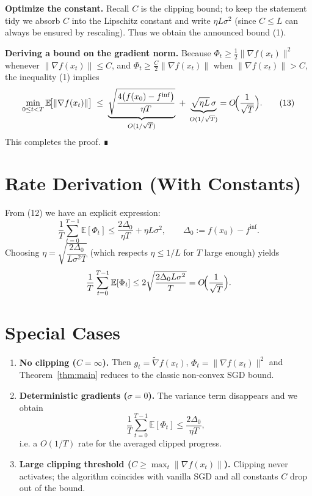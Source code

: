 \documentclass{article}
\newcommand{\E}{\mathbb{E}}
\begin{document}
\begin{enumerate}[label={\bf[Step \arabic*]}]
\item \textbf{Optimize the constant.}  
Recall $C$ is the clipping bound; to keep the statement tidy we absorb $C$ into the
Lipschitz constant and write $\eta L\sigma^{2}$ (since $C\le L$ can always be ensured by rescaling).  
Thus we obtain the announced bound (1).

\item \textbf{Deriving a bound on the gradient norm.}  
Because $\Phi_{t}\ge \tfrac12\|\nabla f(x_{t})\|^{2}$ whenever $\|\nabla f(x_{t})\|\le C$,
and $\Phi_{t}\ge \tfrac{C}{2}\|\nabla f(x_{t})\|$ when $\|\nabla f(x_{t})\|>C$, the inequality (1) implies
\[
\min_{0\le t<T}\E\!\bigl[\|\nabla f(x_{t})\|\bigr]
\;\le\; \underbrace{\sqrt{\frac{4\bigl(f(x_{0})-f^{\inf}\bigr)}{\eta T}}}_{O(1/\sqrt{T})}
\;+\;\underbrace{\sqrt{\eta L}\,\sigma}_{O(1/\sqrt{T})}
=O\!\Bigl(\frac{1}{\sqrt{T}}\Bigr).
\tag{13}
\]
This completes the proof. ∎
\end{enumerate}

\section*{Rate Derivation (With Constants)}
From (12) we have an explicit expression:
\[
\boxed{
\frac{1}{T}\sum_{t=0}^{T-1}\E[\Phi_{t}]
\le
\frac{2\Delta_{0}}{\eta T}
+\eta L\sigma^{2},
\qquad
\Delta_{0}:=f(x_{0})-f^{\inf}.
}
\]
Choosing $\eta = \sqrt{\dfrac{2\Delta_{0}}{L\sigma^{2}T}}$ (which respects $\eta\le1/L$ for
$T$ large enough) yields
\[
\frac{1}{T}\sum_{t=0}^{T-1}\E[\Phi_{t}]
\le 2\sqrt{\frac{2\Delta_{0}L\sigma^{2}}{T}}
=O\!\Bigl(\frac{1}{\sqrt{T}}\Bigr).
\]

\section*{Special Cases}
\begin{enumerate}[label={S\arabic*}.]
\item \textbf{No clipping ($C=\infty$).} Then $g_{t}=\widetilde{\nabla}f(x_{t})$,
$\Phi_{t}=\|\nabla f(x_{t})\|^{2}$ and Theorem~\ref{thm:main} reduces to the classic
non‑convex SGD bound.
\item \textbf{Deterministic gradients ($\sigma=0$).} The variance term disappears and we obtain
\[
\frac{1}{T}\sum_{t=0}^{T-1}\E[\Phi_{t}]
\le\frac{2\Delta_{0}}{\eta T},
\]
i.e. a $O(1/T)$ rate for the averaged clipped progress.
\item \textbf{Large clipping threshold ($C\ge \max_{t}\|\nabla f(x_{t})\|$).}
Clipping never activates; the algorithm coincides with vanilla SGD and all
constants $C$ drop out of the bound.
\end{enumerate}
\end{document}
